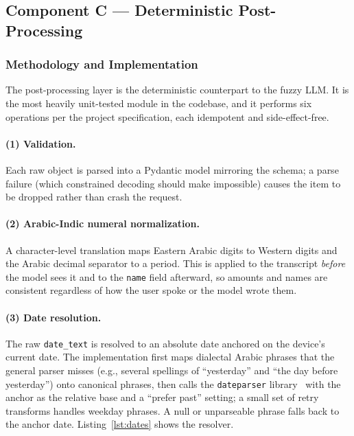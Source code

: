\subsection{Component C --- Deterministic Post-Processing}

\subsubsection{Methodology and Implementation}

The post-processing layer is the deterministic counterpart to the fuzzy LLM. It
is the most heavily unit-tested module in the codebase, and it performs six
operations per the project specification, each idempotent and side-effect-free.

\paragraph{(1) Validation.} Each raw object is parsed into a Pydantic model
mirroring the schema; a parse failure (which constrained decoding should make
impossible) causes the item to be dropped rather than crash the request.

\paragraph{(2) Arabic-Indic numeral normalization.} A character-level
translation maps Eastern Arabic digits to Western digits and the Arabic decimal
separator to a period. This is applied to the transcript \emph{before} the model
sees it and to the \texttt{name} field afterward, so amounts and names are
consistent regardless of how the user spoke or the model wrote them.

\paragraph{(3) Date resolution.} The raw \texttt{date\_text} is resolved to an
absolute date anchored on the device's current date. The implementation first
maps dialectal Arabic phrases that the general parser misses
(e.g., several spellings of ``yesterday'' and ``the day before yesterday'') onto
canonical phrases, then calls the \texttt{dateparser}
library~\cite{dateparser} with the anchor as the relative base and a
``prefer past'' setting; a small set of retry transforms handles weekday phrases.
A null or unparseable phrase falls back to the anchor date.
Listing~\ref{lst:dates} shows the resolver.

